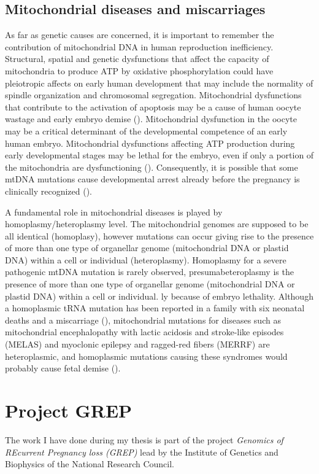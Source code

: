 \subsection{Mitochondrial diseases and miscarriages}

As far as genetic causes are concerned, it is important to remember the contribution of mitochondrial DNA in human reproduction inefficiency. 
Structural, spatial and genetic dysfunctions that affect the capacity of mitochondria to produce ATP by oxidative phosphorylation could have pleiotropic affects on early human development that may include the normality of spindle organization and chromosomal segregation. Mitochondrial dysfunctions that contribute to the activation of apoptosis may be a cause of human oocyte wastage and early embryo demise (\cite{van2004mitochondria}).
Mitochondrial dysfunction in the oocyte may be a critical determinant of the developmental competence of an early human embryo. Mitochondrial dysfunctions affecting ATP production during early developmental stages may be lethal for the embryo, even if only a portion of the mitochondria are dysfunctioning (\cite{karaa2019effects,kaare2009mitochondrial}). Consequently, it is possible that some mtDNA mutations cause developmental arrest already before the pregnancy is clinically recognized (\cite{van2004mitochondria}). 

A fundamental role in mitochondrial diseases is played by homoplasmy/heteroplasmy level. The mitochondrial genomes are supposed to be all identical (homoplasy), however mutations can occur giving rise to the presence of more than one type of organellar genome (mitochondrial DNA or plastid DNA) within a cell or individual (heteroplasmy). Homoplasmy for a severe pathogenic mtDNA mutation is rarely observed, presumabeteroplasmy is the presence of more than one type of organellar genome (mitochondrial DNA or plastid DNA) within a cell or individual. 
ly because of embryo lethality. Although a homoplasmic tRNA mutation has been reported in a family with six neonatal deaths and a miscarriage (\cite{mcfarland2002multiple}), mitochondrial mutations for diseases such as mitochondrial encephalopathy with lactic acidosis and stroke-like episodes (MELAS) and myoclonic epilepsy and ragged-red fibers (MERRF) are heteroplasmic, and homoplasmic mutations causing these syndromes would probably cause fetal demise (\cite{van2004mitochondria}).


\section{Project GREP}
The work I have done during my thesis is part of the project \textit{Genomics of REcurrent Pregnancy loss (GREP)} lead by the Institute of Genetics and Biophysics of the National Research Council. 

